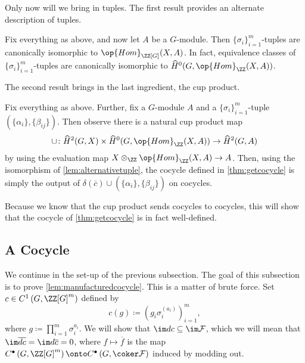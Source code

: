 \documentclass{article}
\numberwithin{equation}{section}
\begin{document}
Only now will we bring in tuples. The first result provides an alternate description of tuples.
\begin{lemma} \label{lem:alternativetuple}
	Fix everything as above, and now let $A$ be a $G$-module. Then $\{\sigma_i\}_{i=1}^m$-tuples are canonically isomorphic to $\op{Hom}_{\ZZ[G]}(X,A)$. In fact, equivalence classes of $\{\sigma_i\}_{i=1}^m$-tuples are canonically isomorphic to $\widehat H^0(G,\op{Hom}_\ZZ(X,A))$.
\end{lemma}
The second result brings in the last ingredient, the cup product.
\begin{theorem} \label{thm:yesitisacocycle}
	Fix everything as above. Further, fix a $G$-module $A$ and a $\{\sigma_i\}_{i=1}^m$-tuple $\left(\{\alpha_i\},\{\beta_{ij}\}\right)$. Then observe there is a natural cup product map
	\[\cup\colon\widehat H^2(G,X)\times\widehat H^0(G,\op{Hom}_\ZZ(X,A))\to\widehat H^2(G,A)\]
	by using the evaluation map $X\otimes_\ZZ\op{Hom}_\ZZ(X,A)\to A$. Then, using the isomorphism of \autoref{lem:alternativetuple}, the cocycle defined in \autoref{thm:getcocycle} is simply the output of $\delta(\overline c)\cup\left(\{\alpha_i\},\{\beta_{ij}\}\right)$ on cocycles.
\end{theorem}
Because we know that the cup product sends cocycles to cocycles, this will show that the cocycle of \autoref{thm:getcocycle} is in fact well-defined.


\subsection{A Cocycle}
We continue in the set-up of the previous subsection. The goal of this subsection is to prove \autoref{lem:manufacturedcocycle}. This is a matter of brute force. Set $c\in C^1\left(G,\ZZ[G]^m\right)$ defined by
\[c(g)\coloneqq\left(g_i\sigma_i^{(a_i)}\right)^m_{i=1},\]
where $g\coloneqq\prod_{i=1}^m\sigma_i^{a_i}$. We will show that $\im dc\subseteq\im\mathcal F$, which we will mean that $\im\overline{dc}=\im d\overline c=0$, where $f\mapsto\overline f$ is the map $C^\bullet\left(G,\ZZ[G]^m\right)\onto C^\bullet\left(G,\coker\mathcal F\right)$ induced by modding out.
\end{document}
